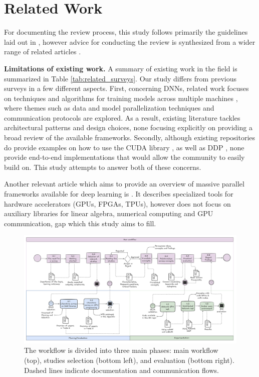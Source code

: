 
\section{Related Work}
\label{sec:related_work}
For documenting the review process, this study follows primarily the guidelines laid out in
\cite{keele_systematic_2007}, however advice for conducting the review is synthesized from a wider
range of related articles
\cite{brereton_lessons_2007-1,kitchenham_procedures_nodate,budgen_reporting_2018,dos_santos_sustainable_2024}.

\textbf{Limitations of existing work.}
A summary of existing work in the field is summarized in Table \ref{tab:related_surveys}.
Our study differs from previous surveys in a few different aspects. First, concerning DNNs,
related work focuses on techniques and algorithms for training models across multiple machines
\cite{dehghani_distributed_2023, chahal_hitchhikers_2018, berloco_systematic_2022}, where themes
such as data and model parallelization techniques and communication protocols are explored. As a
result, existing literature tackles architectural patterns and design choices, none focusing
explicitly on providing a broad review of the available frameworks. Secondly, although existing
repositories do provide examples on how to use the CUDA library
\cite{noauthor_nvidiacuda-samples_2025}, as well as DDP
\cite{noauthor_examplesdistributedddpreadmemd_nodate}, none provide end-to-end implementations that
would allow the community to easily build on. This study attempts to answer both of these concerns.

Another relevant article which aims to provide an overview of massive parallel frameworks available
for deep learning is \cite{nguyen_machine_2019}. It describes specialized tools for hardware
accelerators (GPUs, FPGAs, TPUs), however does not focus on auxiliary libraries for linear algebra,
numerical computing and GPU communication, gap which this study aims to fill.

\begin{figure}[th]
	\centering
	\includegraphics[width=\linewidth]{figures/workflow2}
	\caption{The workflow is divided into three main phases: main workflow (top), studies selection (bottom left), and
		evaluation (bottom right). Dashed lines indicate documentation and communication flows.}
	\label{fig:workflow}
\end{figure}

